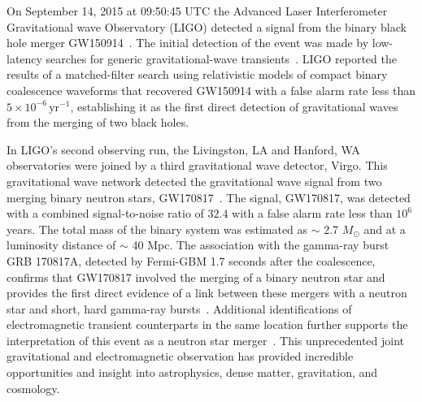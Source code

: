 On September 14, 2015 at 09:50:45 UTC the Advanced Laser Interferometer Gravitational wave Observatory (LIGO) detected a signal from the binary black hole merger GW150914~\cite{GW150914-DETECTION}. The initial detection of the event was made by low-latency searches for generic gravitational-wave transients~\cite{GW150914-BURST}. LIGO reported the results of a matched-filter search using relativistic models of compact binary coalescence waveforms that recovered GW150914 with a false alarm rate less than $5 \times 10^{-6} \, \text{yr}^{-1}$, establishing it as the first direct detection of gravitational waves from the merging of two black holes.

In LIGO's second observing run, the Livingston, LA and Hanford, WA observatories were joined by a third gravitational wave detector, Virgo. This gravitational wave network detected the gravitational wave signal from two merging binary neutron stars, GW170817~\cite{abbott2017gw170817}. The signal, GW170817, was detected with a combined signal-to-noise ratio of $32.4$ with a false alarm rate less than $10^6$ years. The total mass of the binary system was estimated as $\sim$ 2.7 $M_\odot$ and at a luminosity distance of $\sim$ 40 Mpc. The association with the gamma-ray burst GRB 170817A, detected by Fermi-GBM 1.7 seconds after the coalescence, confirms that GW170817 involved the merging of a binary neutron star and provides the first direct evidence of a link between these mergers with a neutron star and short, hard gamma-ray bursts~\cite{Goldstein_2017}. Additional identifications of electromagnetic transient counterparts in the same location further supports the interpretation of this event as a neutron star merger~\cite{Abbott_2017_mma}. This unprecedented joint gravitational and electromagnetic observation has provided incredible opportunities and insight into astrophysics, dense matter, gravitation, and cosmology.

